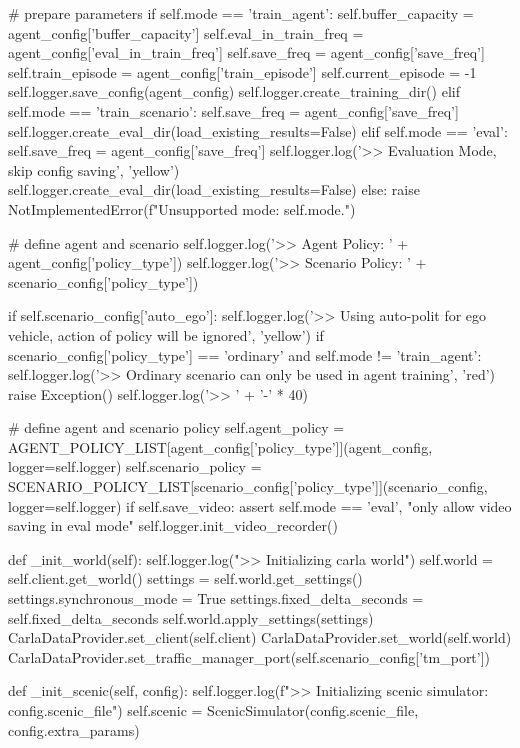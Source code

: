 \begin{appendix}
\# prepare parameters
if self.mode == 'train\_agent':
self.buffer\_capacity = agent\_config['buffer\_capacity']
self.eval\_in\_train\_freq = agent\_config['eval\_in\_train\_freq']
self.save\_freq = agent\_config['save\_freq']
self.train\_episode = agent\_config['train\_episode']
self.current\_episode = -1
self.logger.save\_config(agent\_config)
self.logger.create\_training\_dir()
elif self.mode == 'train\_scenario':
self.save\_freq = agent\_config['save\_freq']
self.logger.create\_eval\_dir(load\_existing\_results=False)
elif self.mode == 'eval':
self.save\_freq = agent\_config['save\_freq']
self.logger.log('>> Evaluation Mode, skip config saving', 'yellow')
self.logger.create\_eval\_dir(load\_existing\_results=False)
else:
raise NotImplementedError(f"Unsupported mode: {self.mode}.")

\# define agent and scenario
self.logger.log('>> Agent Policy: ' + agent\_config['policy\_type'])
self.logger.log('>> Scenario Policy: ' + scenario\_config['policy\_type'])

if self.scenario\_config['auto\_ego']:
self.logger.log('>> Using auto-polit for ego vehicle, action of policy will be ignored', 'yellow')
if scenario\_config['policy\_type'] == 'ordinary' and self.mode != 'train\_agent':
self.logger.log('>> Ordinary scenario can only be used in agent training', 'red')
raise Exception()
self.logger.log('>> ' + '-' * 40)

\# define agent and scenario policy
self.agent\_policy = AGENT\_POLICY\_LIST[agent\_config['policy\_type']](agent\_config, logger=self.logger)
self.scenario\_policy = SCENARIO\_POLICY\_LIST[scenario\_config['policy\_type']](scenario\_config, logger=self.logger)
if self.save\_video:
assert self.mode == 'eval', "only allow video saving in eval mode"
self.logger.init\_video\_recorder()

def \_init\_world(self):
self.logger.log(">> Initializing carla world")
self.world = self.client.get\_world()
settings = self.world.get\_settings()
settings.synchronous\_mode = True
settings.fixed\_delta\_seconds = self.fixed\_delta\_seconds
self.world.apply\_settings(settings)
CarlaDataProvider.set\_client(self.client)
CarlaDataProvider.set\_world(self.world)
CarlaDataProvider.set\_traffic\_manager\_port(self.scenario\_config['tm\_port'])

def \_init\_scenic(self, config):
self.logger.log(f">> Initializing scenic simulator: {config.scenic\_file}")
self.scenic = ScenicSimulator(config.scenic\_file, config.extra\_params)


\end{appendix}
